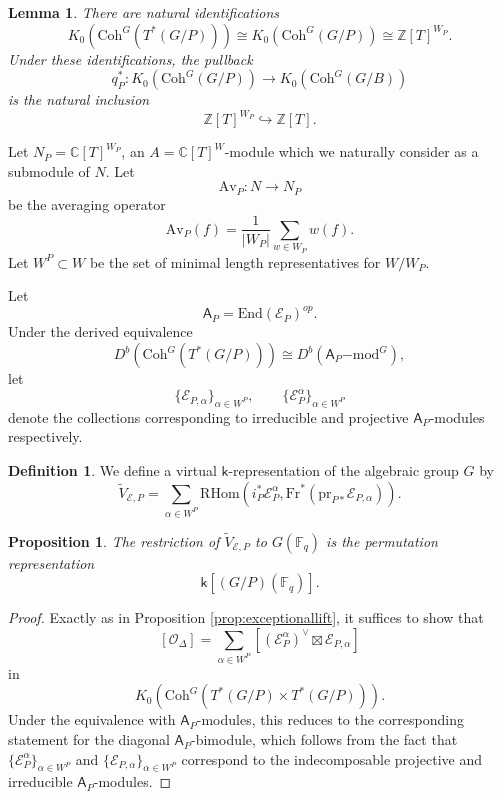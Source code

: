\documentclass{amsart}
\newtheorem{lemma}[thm]{Lemma}
\newtheorem{prop}[thm]{Proposition}
\theoremstyle{definition}
\newtheorem{defn}[thm]{Definition}
\begin{document}
\begin{lemma}\label{lem:k0gp}
There are natural identifications
\[
K_0(\mathrm{Coh}^G(T^*(G/P)))
\cong
K_0(\mathrm{Coh}^G(G/P))
\cong
\mathbb{Z}[T]^{W_P}.
\]
Under these identifications, the pullback
\[
q_P^*\colon K_0(\mathrm{Coh}^G(G/P))\to K_0(\mathrm{Coh}^G(G/B))
\]
is the natural inclusion
\[
\mathbb{Z}[T]^{W_P}\hookrightarrow \mathbb{Z}[T].
\]
\end{lemma}

Let $N_P=\mathbb{C}[T]^{W_P}$, an $A = \mathbb{C}[T]^W$-module which we naturally consider as a submodule of $N$. Let
\[
\mathrm{Av}_P\colon N\to N_P
\]
be the averaging operator
\[
\mathrm{Av}_P(f)=\frac{1}{|W_P|}\sum_{w\in W_P}w(f).
\]
Let $W^P\subset W$ be the set of minimal length representatives for $W/W_P$.

Let
\[
\mathsf{A}_P = \mathrm{End}(\mathcal E_{P})^{op}.
\]
Under the derived equivalence
\[
D^b(\mathrm{Coh}^G(T^*(G/P))) \cong D^b(\mathsf{A}_P\mathrm{-mod}^G),
\]
let
\[
\{\mathcal E_{P,\alpha}\}_{\alpha\in W^P},
\qquad
\{\mathcal E_P^{\alpha}\}_{\alpha\in W^P}
\]
denote the collections corresponding to irreducible and projective
$\mathsf A_P$-modules respectively.

\begin{defn}\label{def:vep}
We define a virtual $\mathsf{k}$-representation of the algebraic group $G$ by
\[
\tilde V_{\mathcal E,P}
=
\sum_{\alpha\in W^P}
\mathrm{RHom}\!\left(i_P^*\mathcal E_P^{\alpha},
\mathrm{Fr}^*(\mathrm{pr}_{P*}\mathcal E_{P,\alpha})\right).
\]
\end{defn}

\begin{prop}\label{prop:gp-categorical-lift}
The restriction of $\tilde V_{\mathcal E,P}$ to $G(\mathbb{F}_q)$ is the permutation
representation
\[
\mathsf{k}[(G/P)(\mathbb{F}_q)].
\]
\end{prop}

\begin{proof}
Exactly as in Proposition \ref{prop:exceptionallift}, it suffices to show that
\[
[\mathcal O_\Delta]
=
\sum_{\alpha\in W^P}
[(\mathcal E_P^{\alpha})^\vee\boxtimes \mathcal E_{P,\alpha}]
\]
in
\[
K_0(\mathrm{Coh}^G(T^*(G/P)\times T^*(G/P))).
\]
Under the equivalence with $\mathsf{A}_P$-modules, this reduces to the corresponding statement for the diagonal $\mathsf A_P$-bimodule, which follows from the fact that $\{\mathcal E_P^\alpha\}_{\alpha \in W^P}$ and $\{\mathcal E_{P,\alpha}\}_{\alpha \in W^P}$ correspond to the indecomposable projective and irreducible $\mathsf A_P$-modules.
\end{proof}
\end{document}
